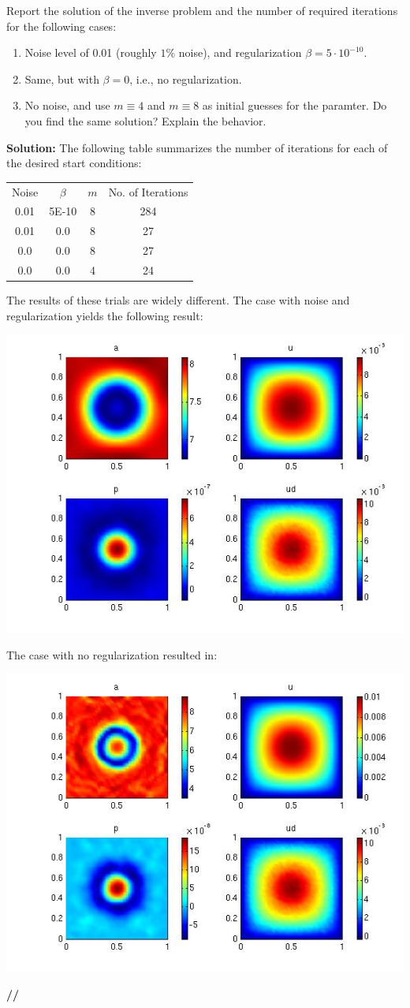 \documentclass[11pt]{article}
\newenvironment{solution}{\begin{trivlist}\item[]{\bf Solution:}}
                      {\textbf{//} \end{trivlist}}
\begin{document}
\begin{enumerate}
\item[(a)] Report the solution of the inverse problem and the number of
	  required iterations for the following cases:



\begin{enumerate}
 \item[$\bullet$] Noise level of 0.01 (roughly $1\%$ noise), and
	      regularization $\beta = 5 \cdot 10^{-10}$.
 \item[$\bullet$] Same, but with $\beta = 0$, i.e., no regularization. 
 \item[$\bullet$] No noise, and use $m \equiv 4$ and $m \equiv 8$ as
	      initial guesses for the paramter. Do you find the same solution? Explain the behavior. 
\end{enumerate}
\begin{solution}
The following table summarizes the number of iterations for each of the
 desired start conditions: 
\begin{center}
\begin{tabular}{| c | c | c | c |} \cline{1-4}
Noise & $\beta$ & $m$ & No. of Iterations \\ \cline{1-4}
0.01 & 5E-10 & 8 & 284 \\ \cline{1-4}
0.01 & 0.0 & 8 & 27 \\ \cline{1-4}
0.0 & 0.0 & 8 & 27 \\ \cline{1-4}
0.0 & 0.0 & 4 & 24 \\ \cline{1-4} 
\end{tabular} 
\end{center}
The results of these trials are widely different. The case with noise
 and regularization yields the following result: 
\begin{center}
\includegraphics[width = 6 cm]{figs/prob2aNoiseRegM8.jpg}
\end{center}

The case with no regularization resulted in:
\begin{center}
\includegraphics[width = 6 cm]{figs/prob2aNoiseNoRegM8.jpg}
\end{center}


\end{solution}
\end{enumerate}
\end{document}
